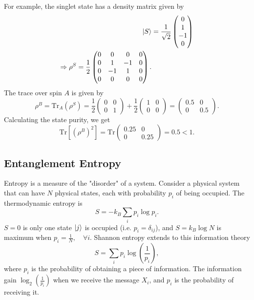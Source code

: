 \documentclass{article}
\begin{document}
For example, the singlet state has a density matrix given by
\begin{align*}
    \ket{S} &= \frac{1}{\sqrt{2}}\begin{pmatrix}
        0\\1\\-1\\0
    \end{pmatrix}\\
    \Rightarrow \rho ^S=\frac{1}{2}\begin{pmatrix}
        0&0&0&0\\
        0&1&-1&0\\
        0&-1&1&0\\
        0&0&0&0
    \end{pmatrix}.
\end{align*}
The trace over spin $A$ is given by 
\[
    \rho ^B=\text{Tr}_A(\rho ^S)=\frac{1}{2}\begin{pmatrix}
        0&0\\0&1
    \end{pmatrix}+\frac{1}{2}\begin{pmatrix}
        1&0\\0&0
    \end{pmatrix}=\begin{pmatrix}
        0.5 & 0 \\0&0.5
    \end{pmatrix}.
\]
Calculating the state purity, we get 
\[
    \text{Tr}\left[ \left( \rho ^B \right)^2 \right]=\text{Tr}\begin{pmatrix}
        0.25 & 0\\0&0.25
    \end{pmatrix}=0.5<1.
\]

\subsection{Entanglement Entropy}
Entropy is a measure of the "disorder" of a system. Consider a physical system that can have $N$ physical states, each with probability $p_i$ of being occupied. The thermodynamic entropy is 
\[
    S=-k_B \sum_{i}p_i \log p_i.
\]
$S=0$ is only one state $\ket{j}$ is occupied (i.e. $p_i=\delta _{ij}$), and $S=k_B\log N$ is maximum when $p_i=\frac{1}{N},\quad \forall i$. Shannon entropy extends to this information theory 
\[
    S=\sum_{i}p_i\log \left( \frac{1}{p_i} \right),
\]
where $p_i$ is the probability of obtaining a piece of information. The information gain $\log_2 \left( \frac{1}{p_i} \right)$ when we receive the message $X_i$, and $p_i$ is the probability of receiving it.
\end{document}
